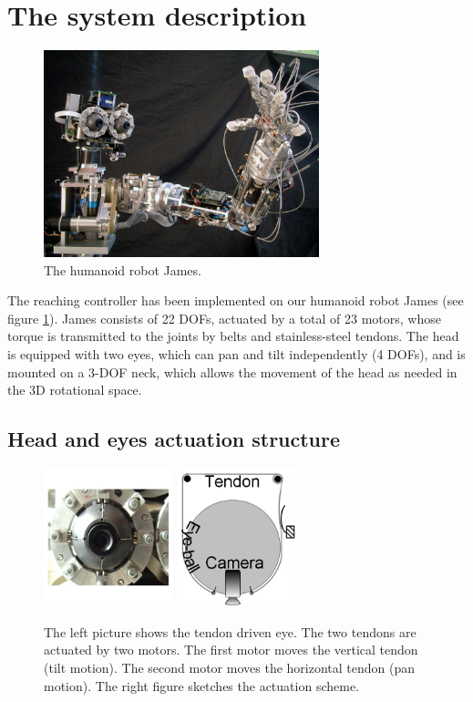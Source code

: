 \section{The system description}

\begin{figure}[h!tbp]
\centering
\includegraphics[width=80mm]{Figure/James1.jpg}
\caption{The humanoid robot James.}
\label{Fig:PicureJames}
\end{figure}

The reaching controller has been implemented on our humanoid robot James (see figure \ref{Fig:PicureJames}). James consists of 22 DOFs, actuated by a total of 23 motors, whose torque is transmitted to the joints by belts and stainless-steel tendons. The head is equipped with two eyes, which can pan and tilt independently (4 DOFs), and is mounted on a 3-DOF neck, which allows the movement of the head as needed in the 3D rotational space.


\subsection{Head and eyes actuation structure} \label{Sec:HeadEyesStructure}

\begin{figure}
  \centering
  \includegraphics[height=40mm]{Figure/EyePhoto.jpg} \hspace{1cm}
  \includegraphics[height=40mm]{Figure/EyeSection.jpg}\\
  \caption{The left picture shows the tendon driven eye. The
 two tendons are actuated by two motors. The first motor moves the vertical
  tendon (tilt motion). The second motor moves the horizontal tendon (pan motion). The
  right figure sketches the actuation scheme.}\label{Fig:EyeSection}
\end{figure}


